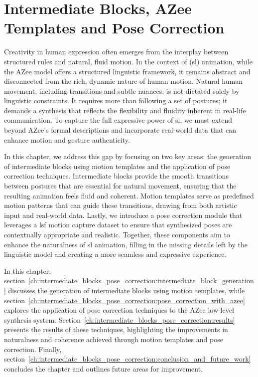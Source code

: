\documentclass[../../main.tex]{subfiles}
\begin{document}
\chapter{Intermediate Blocks, AZee Templates and Pose Correction}
\label{ch:intermediate_blocks_pose_correction}

Creativity in human expression often emerges from the interplay between structured rules and natural, fluid motion. In the context of (\gls{sl}) animation, while the AZee model offers a structured linguistic framework, it remains abstract and disconnected from the rich, dynamic nature of human motion. Natural human movement, including transitions and subtle nuances, is not dictated solely by linguistic constraints. It requires more than following a set of postures; it demands a synthesis that reflects the flexibility and fluidity inherent in real-life communication. To capture the full expressive power of \gls{sl}, we must extend beyond AZee's formal descriptions and incorporate real-world data that can enhance motion and gesture authenticity.

In this chapter, we address this gap by focusing on two key areas: the generation of intermediate blocks using motion templates and the application of pose correction techniques. Intermediate blocks provide the smooth transitions between postures that are essential for natural movement, ensuring that the resulting animation feels fluid and coherent. Motion templates serve as predefined motion patterns that can guide these transitions, drawing from both artistic input and real-world data. Lastly, we introduce a pose correction module that leverages a \gls{lsf} motion capture dataset to ensure that synthesized poses are contextually appropriate and realistic. Together, these components aim to enhance the naturalness of \gls{sl} animation, filling in the missing details left by the linguistic model and creating a more seamless and expressive experience.

In this chapter, section~\ref{ch:intermediate_blocks_pose_correction:intermediate_block_generation} discusses the generation of intermediate blocks using motion templates, while section~\ref{ch:intermediate_blocks_pose_correction:pose_correction_with_azee} explores the application of pose correction techniques to the AZee low-level synthesis system. Section~\ref{ch:intermediate_blocks_pose_correction:results} presents the results of these techniques, highlighting the improvements in naturalness and coherence achieved through motion templates and pose correction. Finally, section~\ref{ch:intermediate_blocks_pose_correction:conclusion_and_future_work} concludes the chapter and outlines future areas for improvement.
\end{document}
